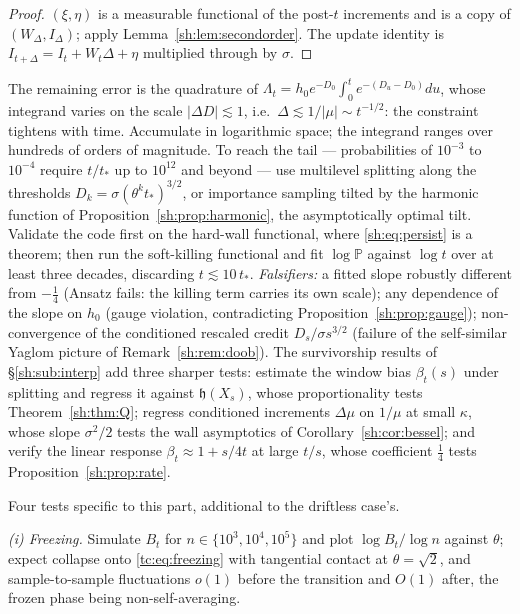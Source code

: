 \documentclass[11pt]{article}
\numberwithin{equation}{section}
\theoremstyle{plain}
\theoremstyle{definition}
\theoremstyle{remark}
\newcommand{\PP}{\mathbb{P}}
\newcommand{\hm}{\mathfrak{h}}
\begin{document}
\begin{proof}
$(\xi,\eta)$ is a measurable functional of the post-$t$ increments and is a
copy of $(W_\Delta,I_\Delta)$; apply Lemma~\ref{sh:lem:secondorder}. The
update identity is
$I_{t+\Delta}=I_t+W_t\Delta+\eta$ multiplied through by $\sigma$.
\end{proof}

The remaining error is the quadrature of
$\Lambda_t=h_0e^{-D_0}\int_0^te^{-(D_u-D_0)}du$, whose integrand varies on
the scale $|\Delta D|\lesssim1$, i.e.\ $\Delta\lesssim1/|\mu|\sim
t^{-1/2}$: the constraint tightens with time. Accumulate in logarithmic
space; the integrand ranges over hundreds of orders of magnitude. To reach
the tail --- probabilities of $10^{-3}$ to $10^{-4}$ require
$t/t_*$ up to $10^{12}$ and beyond --- use multilevel splitting along the
thresholds $D_k=\sigma(\theta^kt_*)^{3/2}$, or importance sampling tilted
by the harmonic function of Proposition~\ref{sh:prop:harmonic}, the
asymptotically optimal tilt. Validate the code first on the hard-wall
functional, where \eqref{sh:eq:persist} is a theorem; then run the
soft-killing functional and fit $\log\PP$ against $\log t$ over at least
three decades, discarding $t\lesssim10\,t_*$.
\emph{Falsifiers:} a fitted slope robustly different from $-\tfrac14$
(Ansatz fails: the killing term carries its own scale); any dependence of
the slope on $h_0$ (gauge violation, contradicting
Proposition~\ref{sh:prop:gauge}); non-convergence of the conditioned
rescaled credit $D_s/\sigma s^{3/2}$ (failure of the self-similar Yaglom
picture of Remark~\ref{sh:rem:doob}). The survivorship results of
\S\ref{sh:sub:interp} add three sharper tests: estimate the window bias
$\beta_t(s)$ under splitting and regress it against $\hm(X_s)$, whose
proportionality tests Theorem~\ref{sh:thm:Q}; regress conditioned
increments $\Delta\mu$ on $1/\mu$ at small $\kappa$, whose slope
$\sigma^2/2$ tests the wall asymptotics of
Corollary~\ref{sh:cor:bessel}; and verify the linear response
$\beta_t\approx1+s/4t$ at large $t/s$, whose coefficient $\tfrac14$ tests
Proposition~\ref{sh:prop:rate}.

\label{tc:sub:numerics}

Four tests specific to this part, additional to the driftless case's.

\emph{(i) Freezing.} Simulate $B_t$ for $n\in\{10^{3},10^{4},10^{5}\}$
and plot $\log B_t/\log n$ against $\theta$; expect collapse onto
\eqref{tc:eq:freezing} with tangential contact at $\theta=\sqrt2$, and
sample-to-sample fluctuations $o(1)$ before the transition and $O(1)$
after, the frozen phase being non-self-averaging.
\end{document}
